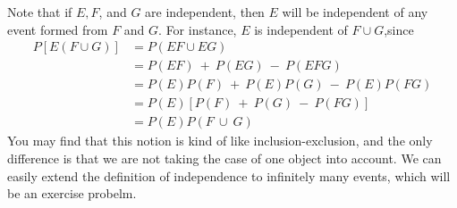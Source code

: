         Note that if $E,F$, and $G$ are independent, then $E$ will be independent of any
        event formed from $F$ and $G.$ For instance, $E$ is independent of $F\cup G$,since
        \[\begin{aligned}P[E(F\cup G)]&=P(EF\cup EG)\\&=P(EF)\:+\:P(EG)\:-\:P(EFG)\\&=P(E)P(F)\:+\:P(E)P(G)\:-\:P(E)P(FG)\\&=P(E)[P(F)\:+\:P(G)\:-\:P(FG)]\\&=P(E)P(F\:\cup\:G)\end{aligned}\]
        You may find that this notion is kind of like inclusion-exclusion, and the only difference is that
        we are not taking the case of one object into account. We can easily extend the definition of 
        independence to infinitely many events, which will be an exercise probelm.

